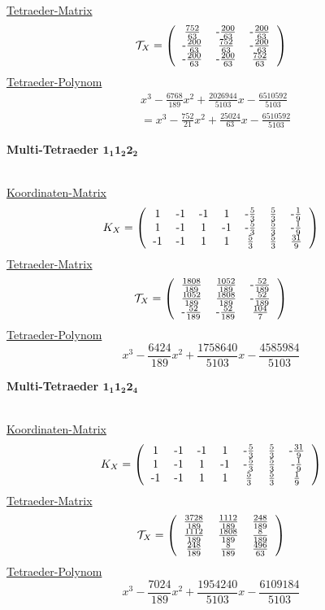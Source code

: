 \documentclass[12pt,titlepage,twoside,cleardoublepage]{article}
\theoremstyle{nummermitklammern}
\numberwithin{equation}{section}
\begin{document}
\underline{Tetraeder-Matrix}
\[
\mathcal{T}_X=\left(\begin{tabular}{ccc}
$\frac{752}{63}$& -$\frac{200}{63}$&-$\frac{200}{63}$ \\
 -$\frac{200}{63}$&$ \frac{752}{63}$&-$\frac{200}{63}$\\
 -$\frac{200}{63}$& -$\frac{200}{63}$& $\frac{752}{63}$ \\
\end{tabular}\right)
\]
\underline{Tetraeder-Polynom}
\begin{align*}
&x^3-\frac{6768}{189}x^2+\frac{2026944}{5103}x-\frac{6510592}{5103}\\
&=x^3-\frac{752}{21}x^2+\frac{25024}{63}x-\frac{6510592}{5103}
\end{align*}
 \begin{large}
 \textbf{Multi-Tetraeder $\textbf{1}_\textbf{1}\textbf{1}_\textbf{2}\textbf{2}_\textbf{2}$}
 \end{large}\\
 \underline{Koordinaten-Matrix}
\[
K_X=\left(\begin{tabular}{ccccccc}
 1&-1&-1&1&-$\frac{5}{3}$&$\frac{5}{3}$&-$\frac{1}{9}$\\
 1&-1&1&-1&-$\frac{5}{3}$&$\frac{5}{3}$&-$\frac{1}{9}$\\
-1&-1&1&1&$\frac{5}{3}$&$\frac{5}{3}$&$\frac{31}{9}$\\
\end{tabular}\right)
\] 
\underline{Tetraeder-Matrix}
\[
\mathcal{T}_X=\left(\begin{tabular}{ccc}
$\frac{1808}{189}$& $\frac{1052}{189}$& -$\frac{52}{189}$ \\
 $\frac{1052}{189}$& $\frac{1808}{189}$& -$\frac{52}{189}$ \\
 -$\frac{52}{189}$& -$\frac{52}{189}$& $\frac{104}{7}$ \\ 
\end{tabular}\right)
\]
\underline{Tetraeder-Polynom}
\[
  x^3-\frac{6424}{189}x^2+\frac{1758640}{5103}x-\frac{4585984}{5103}
\]
 \begin{large}
 \textbf{Multi-Tetraeder $\textbf{1}_\textbf{1}\textbf{1}_\textbf{2}\textbf{2}_\textbf{4}$}
 \end{large}\\
\underline{Koordinaten-Matrix} 
 \[
K_X=\left(\begin{tabular}{ccccccc}
 1&-1&-1&1&-$\frac{5}{3}$&$\frac{5}{3}$&-$\frac{31}{9}$\\
 1&-1&1&-1&-$\frac{5}{3}$&$\frac{5}{3}$&-$\frac{1}{9}$\\
-1&-1&1&1&$\frac{5}{3}$&$\frac{5}{3}$&$\frac{1}{9}$\\
\end{tabular}\right)
\] 
\underline{Tetraeder-Matrix}
\[
\mathcal{T}_X=\left(\begin{tabular}{ccc}
 $\frac{3728}{189}$&$\frac{1112}{189}$& $\frac{248}{189}$\\
 $\frac{1112}{189}$& $\frac{1808}{189}$& $\frac{8}{189}$ \\
 $\frac{248}{189}$& $\frac{8}{189}$&$\frac{ 496}{63}$ \\
\end{tabular}\right)
\]
\underline{Tetraeder-Polynom}
\[
  x^3-\frac{7024}{189}x^2+\frac{1954240}{5103}x-\frac{6109184}{5103} 
\] 
\newpage
\end{document}
